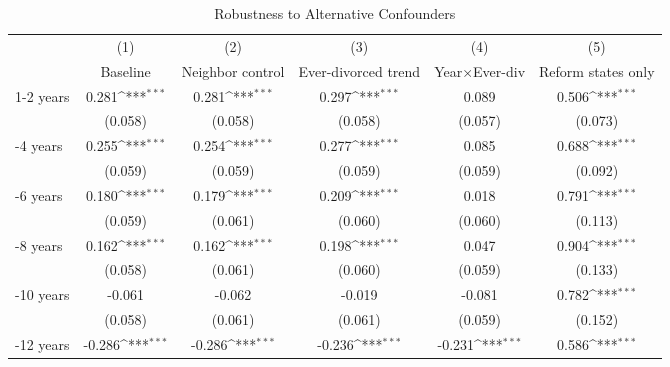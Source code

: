 \begin{table}[htbp]\centering
\def\sym#1{\ifmmode^{#1}\else\(^{#1}\)\fi}
\caption{Robustness to Alternative Confounders}
\begin{tabular}{l*{5}{c}}
\toprule
                    &\multicolumn{1}{c}{(1)}&\multicolumn{1}{c}{(2)}&\multicolumn{1}{c}{(3)}&\multicolumn{1}{c}{(4)}&\multicolumn{1}{c}{(5)}\\
                    &\multicolumn{1}{c}{Baseline}&\multicolumn{1}{c}{Neighbor control}&\multicolumn{1}{c}{Ever-divorced trend}&\multicolumn{1}{c}{Year×Ever-div}&\multicolumn{1}{c}{Reform states only}\\
\midrule
1-2 years           &       0.281\sym{***}&       0.281\sym{***}&       0.297\sym{***}&       0.089         &       0.506\sym{***}\\
                    &     (0.058)         &     (0.058)         &     (0.058)         &     (0.057)         &     (0.073)         \\
\addlinespace
3-4 years           &       0.255\sym{***}&       0.254\sym{***}&       0.277\sym{***}&       0.085         &       0.688\sym{***}\\
                    &     (0.059)         &     (0.059)         &     (0.059)         &     (0.059)         &     (0.092)         \\
\addlinespace
5-6 years           &       0.180\sym{***}&       0.179\sym{***}&       0.209\sym{***}&       0.018         &       0.791\sym{***}\\
                    &     (0.059)         &     (0.061)         &     (0.060)         &     (0.060)         &     (0.113)         \\
\addlinespace
7-8 years           &       0.162\sym{***}&       0.162\sym{***}&       0.198\sym{***}&       0.047         &       0.904\sym{***}\\
                    &     (0.058)         &     (0.061)         &     (0.060)         &     (0.059)         &     (0.133)         \\
\addlinespace
9-10 years          &      -0.061         &      -0.062         &      -0.019         &      -0.081         &       0.782\sym{***}\\
                    &     (0.058)         &     (0.061)         &     (0.061)         &     (0.059)         &     (0.152)         \\
\addlinespace
11-12 years         &      -0.286\sym{***}&      -0.286\sym{***}&      -0.236\sym{***}&      -0.231\sym{***}&       0.586\sym{***}\\

\end{tabular}
\end{table}
